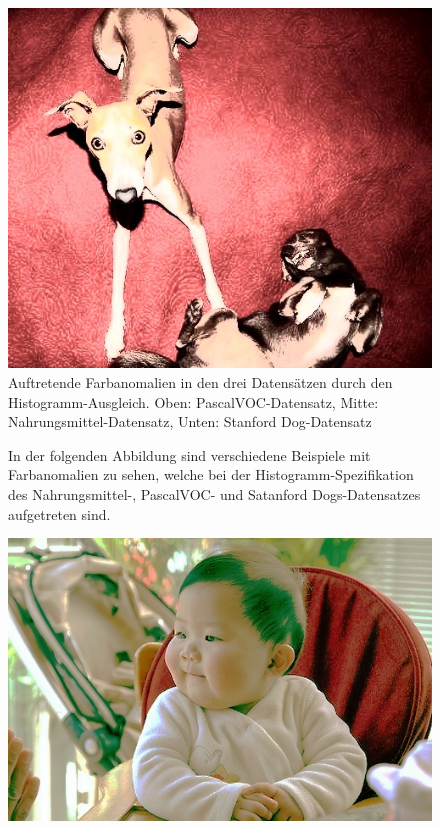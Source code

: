 \begin{appendices}
\begin{figure}[htb]
\begin{minipage}{0.19\textwidth}
\includegraphics[width=\textwidth]{images/anomalien/HA/n02091032_12113.jpg}
\end{minipage}
\caption{Auftretende Farbanomalien in den drei Datensätzen durch den Histogramm-Ausgleich. Oben: PascalVOC-Datensatz, Mitte: Nahrungsmittel-Datensatz, Unten: Stanford Dog-Datensatz}
\label{img:anoHA}
\end{figure}
\newpage 
\begin{figure}[htb]
\center
\begin{minipage}{\textwidth}
In der folgenden Abbildung sind verschiedene Beispiele mit Farbanomalien zu sehen, welche bei der Histogramm-Spezifikation des Nahrungsmittel-, PascalVOC- und Satanford Dogs-Datensatzes aufgetreten sind.
\end{minipage}
\begin{minipage}{\textwidth}
\hspace{\textwidth}
\end{minipage}
\begin{minipage}{0.19\textwidth}
\includegraphics[width=\textwidth]{images/anomalien/HS/000174.jpg}

\end{minipage}
\end{figure}
\end{appendices}
